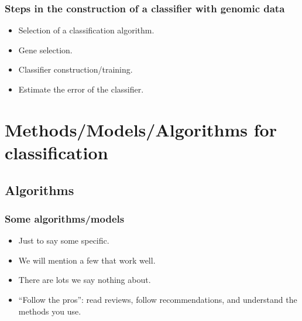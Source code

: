 \begin{frame}
\frametitle{Steps in the construction of a classifier with genomic data}
\begin{itemize}
\item Selection of a classification algorithm.
\item Gene selection.
\item Classifier construction/training.
\item Estimate the error of the classifier.
\end{itemize}
\end{frame}




\section[Algorithms]{Methods/Models/Algorithms for classification}
\subsection{Algorithms}
\begin{frame}
\frametitle{Some algorithms/models}
\begin{itemize}
\item Just to say some specific.
\item We will mention a few that work well.
\item There are lots we say nothing about.
\item ``Follow the pros'': read reviews, follow recommendations, and
  understand the methods you use.
\end{itemize}
\end{frame}


